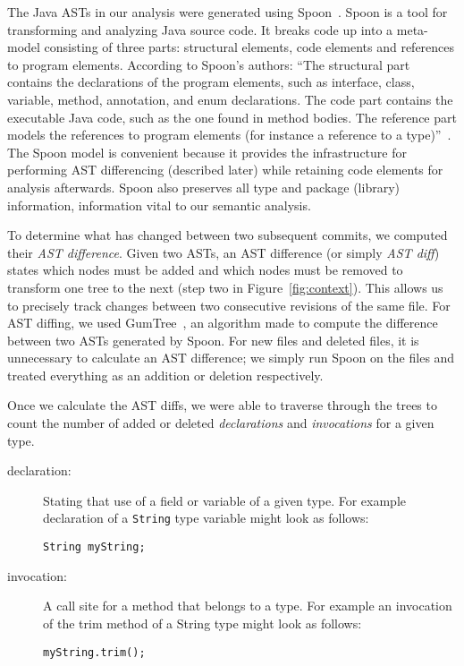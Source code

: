 The Java ASTs in our analysis were generated using Spoon~\cite{pawlak:hal-01169705}. Spoon is a tool for transforming and analyzing Java source code. It breaks code up into a meta-model consisting of three parts: structural elements, code elements and references to program elements. According to Spoon's authors: ``The structural part contains the declarations of the program elements, such as interface, class, variable, method, annotation, and enum declarations.  The code part contains the executable Java code, such as the one found in method bodies. The reference part models the references to program elements (for instance a reference to a type)''~\cite{pawlak:hal-01169705}. The Spoon model is convenient because it provides the infrastructure for performing AST differencing (described later) while retaining code elements for analysis afterwards. Spoon also preserves all type and package (library) information, information vital to our semantic analysis.

To determine what has changed between two subsequent commits, we computed their \emph{AST difference}. Given two ASTs, an AST difference (or simply \emph{AST diff}) states which nodes must be added and which nodes must be removed to transform one tree to the next (step two in Figure~\ref{fig:context}). This allows us to precisely track changes between two consecutive revisions of the same file. For AST diffing, we used GumTree~\cite{falleri:hal-01054552}, an algorithm made to compute the difference between two ASTs generated by Spoon. For new files and deleted files, it is unnecessary to calculate an AST difference; we simply run Spoon on the files and treated everything as an addition or deletion respectively.

Once we calculate the AST diffs, we were able to traverse through the trees to count the number of added or deleted \emph{declarations} and \emph{invocations} for a given type.

\begin{description}
\item [declaration:]
  Stating that use of a field or variable of a given type. For example declaration of a \texttt{String} type variable might look as follows:
  \\
  \begin{adjustwidth}{2.5em}{0pt}
  \texttt{String myString;} \\
  \end{adjustwidth}
\item [invocation:]
  A call site for a method that belongs to a type. For example an invocation of the trim method of a String type might look as follows:
  \\
  \begin{adjustwidth}{2.5em}{0pt}
  \texttt{myString.trim();} \\
  \end{adjustwidth}
\end{description}

